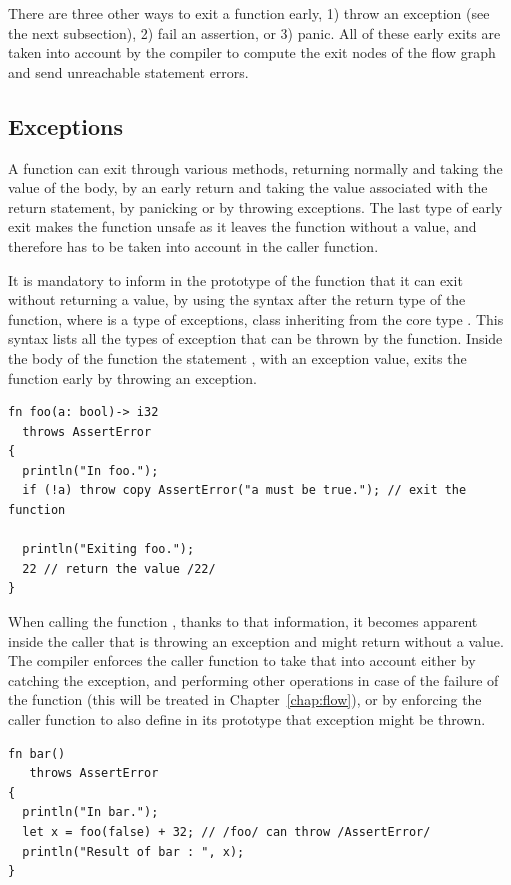 There are three other ways to exit a function early, 1) throw an exception (see
the next subsection), 2) fail an assertion, or 3) panic. All of these early
exits are taken into account by the compiler to compute the exit nodes of the
flow graph and send unreachable statement errors.

\subsection{Exceptions}

A function can exit through various methods, returning normally and taking the
value of the body, by an early return and taking the value associated with the
return statement, by panicking or by throwing exceptions. The last type of early
exit makes the function unsafe as it leaves the function without a value, and
therefore has to be taken into account in the caller function.

It is mandatory to inform in the prototype of the function that it can exit
without returning a value, by using the syntax  after
the return type of the function, where  is a type of exceptions, class
inheriting from the core type . This syntax
lists all the types of exception that can be thrown by the function. Inside the
body of the function the statement , with  an
exception value, exits the function early by throwing an exception.

\begin{lstlisting}[style=coloredverbatim]
fn foo(a: bool)-> i32
  throws AssertError
{
  println("In foo.");
  if (!a) throw copy AssertError("a must be true."); // exit the function

  println("Exiting foo.");
  22 // return the value /22/
}
\end{lstlisting}

When calling the function , thanks to that information, it becomes
apparent inside the caller that  is throwing an exception and might
return without a value. The compiler enforces the caller function to take that
into account either by catching the exception, and performing other operations in
case of the failure of the function  (this will be treated in
Chapter~\ref{chap:flow}), or by enforcing the caller function to also
define in its prototype that exception might be thrown.

\begin{lstlisting}[style=coloredverbatim]
fn bar()
   throws AssertError
{
  println("In bar.");
  let x = foo(false) + 32; // /foo/ can throw /AssertError/
  println("Result of bar : ", x);
}
\end{lstlisting}

